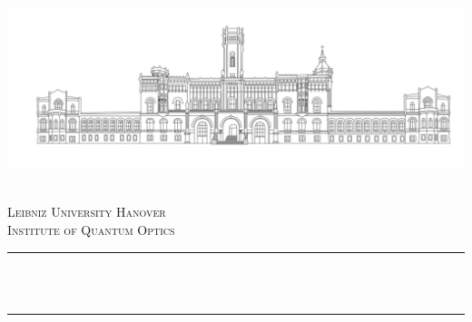 \begin{titlepage}

\newcommand{\HRule}{\rule{\linewidth}{0.5mm}} %

\begin{center}
   \includegraphics[width=\linewidth]{../GRAPHICS/luh.png}\\[1cm] %
\end{center}
 

\center %


\textsc{\LARGE \@subject}\\[1.5cm] %
\textsc{\Large Leibniz University Hanover}\\[0.5cm] %
\textsc{\large Institute of Quantum Optics}\\[0.5cm] %

\makeatletter
\HRule \\[0.7cm]
{ \LARGE \bfseries \@title}\\[0.4cm] %
\HRule \\[1.5cm]
 


\end{titlepage}
